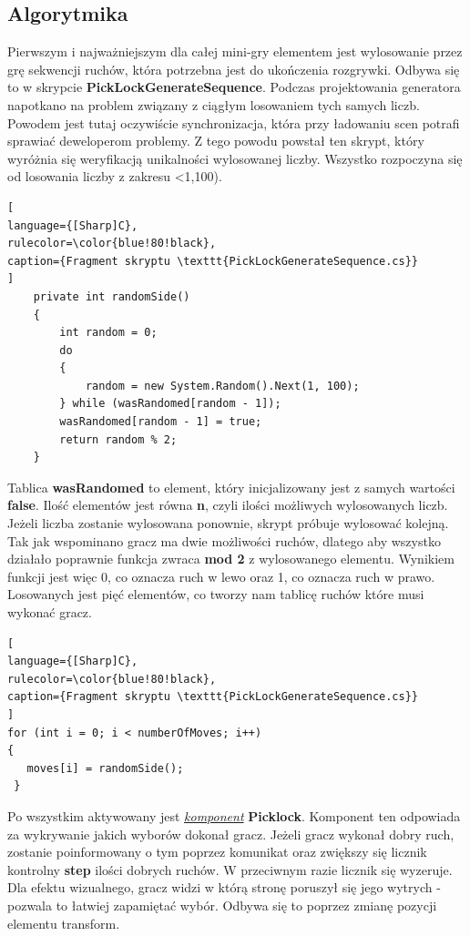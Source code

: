 \documentclass[oneside,polski,logo]{amuthesis}
\begin{document}
\subsection{Algorytmika}
\par Pierwszym i najważniejszym dla całej mini-gry elementem jest wylosowanie przez grę sekwencji ruchów, która potrzebna jest do ukończenia rozgrywki. Odbywa się to w skrypcie \textbf{PickLockGenerateSequence}. Podczas projektowania generatora napotkano na problem związany z ciągłym losowaniem tych samych liczb. Powodem jest tutaj oczywiście synchronizacja, która przy ładowaniu scen potrafi sprawiać deweloperom problemy. Z tego powodu powstał ten skrypt, który wyróżnia się weryfikacją unikalności wylosowanej liczby.
Wszystko rozpoczyna się od losowania liczby z zakresu <1,100). \clearpage
\begin{lstlisting}[
language={[Sharp]C},
rulecolor=\color{blue!80!black},
caption={Fragment skryptu \texttt{PickLockGenerateSequence.cs}}
]
    private int randomSide()
    {
        int random = 0;
        do
        {
            random = new System.Random().Next(1, 100);
        } while (wasRandomed[random - 1]);
        wasRandomed[random - 1] = true;
        return random % 2;
    }
\end{lstlisting}
Tablica \textbf{wasRandomed} to element, który inicjalizowany jest z samych wartości \textbf{false}. Ilość elementów jest równa \textbf{n}, czyli ilości możliwych wylosowanych liczb. Jeżeli liczba zostanie wylosowana ponownie, skrypt próbuje wylosować kolejną. Tak jak wspominano gracz ma dwie możliwości ruchów, dlatego aby wszystko działało poprawnie funkcja zwraca \textbf{mod 2} z wylosowanego elementu. Wynikiem funkcji jest więc 0, co oznacza ruch w lewo oraz 1, co oznacza ruch w prawo. Losowanych jest pięć elementów, co tworzy nam tablicę ruchów które musi wykonać gracz.
\begin{lstlisting}[
language={[Sharp]C},
rulecolor=\color{blue!80!black},
caption={Fragment skryptu \texttt{PickLockGenerateSequence.cs}}
]
for (int i = 0; i < numberOfMoves; i++)
{
   moves[i] = randomSide();
 }
\end{lstlisting}
Po wszystkim aktywowany jest \hyperref[sec:komponent]{\emph{komponent}} \textbf{Picklock}. Komponent ten odpowiada za wykrywanie jakich wyborów dokonał gracz. Jeżeli gracz wykonał dobry ruch, zostanie poinformowany o tym poprzez komunikat oraz zwiększy się licznik kontrolny \textbf{step} ilości dobrych ruchów. W przeciwnym razie licznik się wyzeruje. Dla efektu wizualnego, gracz widzi w którą stronę poruszył się jego wytrych - pozwala to łatwiej zapamiętać wybór. Odbywa się to poprzez zmianę pozycji elementu transform.
\end{document}
